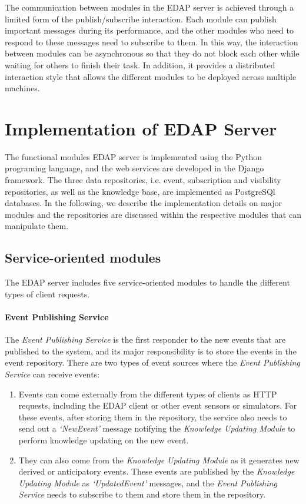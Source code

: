The communication between modules in the EDAP server is achieved through a limited form of the publish/subscribe interaction. Each module can publish important messages during its performance, and the other modules who need to respond to these messages need to subscribe to them. In this way, the interaction between modules can be asynchronous so that they do not block each other while waiting for others to finish their task. In addition, it provides a distributed interaction style that allows the different modules to be deployed across multiple machines. 

\section{Implementation of EDAP Server} %
\label{sec:implementation_of_edap_server}
The functional modules EDAP server is implemented using the Python programing language, and the web services are developed in the Django framework. The three data repositories, i.e. event, subscription and visibility repositories, as well as the knowledge base, are implemented as PostgreSQl databases. In the following, we describe the implementation details on major modules and the repositories are discussed within the respective modules that can manipulate them. 

\subsection{Service-oriented modules} %
\label{sub:service_oriented_modules}
The EDAP server includes five service-oriented modules to handle the different types of client requests. 

\paragraph*{Event Publishing Service} %
\label{par:event_publishing_service}
The \emph{Event Publishing Service} is the first responder to the new events that are published to the system, and its major responsibility is to store the events in the event repository. There are two types of event sources where the \emph{Event Publishing Service} can receive events:

\begin{enumerate}
	\item Events can come externally from the different types of clients as HTTP requests, including the EDAP client or other event sensors or simulators. For these events, after storing them in the repository, the service also needs to send out a \emph{`NewEvent'} message notifying the \emph{Knowledge Updating Module} to perform knowledge updating on the new event.
	\item They can also come from the \emph{Knowledge Updating Module} as it generates new derived or anticipatory events. These events are published by the \emph{Knowledge Updating Module} as \emph{`UpdatedEvent'} messages, and the \emph{Event Publishing Service} needs to subscribe to them and store them in the repository. 
\end{enumerate}

